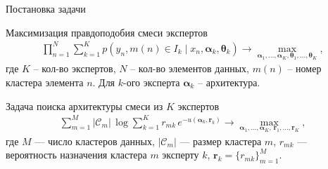 \documentclass{beamer}
\begin{document}
\begin{frame}{Постановка задачи}
    \begin{block}{Максимизация правдоподобия смеси экспертов}
        \vspace{-8mm}
        \begin{gather*}
            \prod_{n=1}^{N} \sum_{k=1}^{K} p(y_n, m(n) \in I_k \mid x_n, \boldsymbol{\alpha}_k, \boldsymbol{\theta}_k) \to \max_{\boldsymbol{\alpha}_1, \dots, \boldsymbol{\alpha}_K, \boldsymbol{\theta}_1, \dots, \boldsymbol{\theta}_K},
        \end{gather*}
        где $K$ -- кол-во экспертов, $N$ -- кол-во элементов данных, $m(n)$ -- номер кластера элемента $n$. Для $k$-ого эксперта $\boldsymbol{\alpha}_k$ -- архитектура.
    \end{block}

    \begin{block}{Задача поиска архитектуры смеси из $K$ экспертов}
    \vspace{-5mm}
    \begin{gather*}
        \sum_{m=1}^{M} |\mathcal{C}_m|\, \log \sum_{k=1}^{K} r_{mk}\, e^{-u(\boldsymbol{\alpha}_k, \mathbf{r}_k)} \to \max_{\boldsymbol{\alpha}_1,\ldots,\boldsymbol{\alpha}_K,\, \mathbf{r}_1,\ldots,\mathbf{r}_K},
    \end{gather*}
    где $M$ --- число кластеров данных, $|\mathcal{C}_m|$ --- размер кластера $m$, $r_{mk}$ --- вероятность назначения кластера $m$ эксперту $k$, $\mathbf{r}_k = \{r_{mk}\}_{m=1}^{M}$.
    \end{block}

\end{frame}
\end{document}
